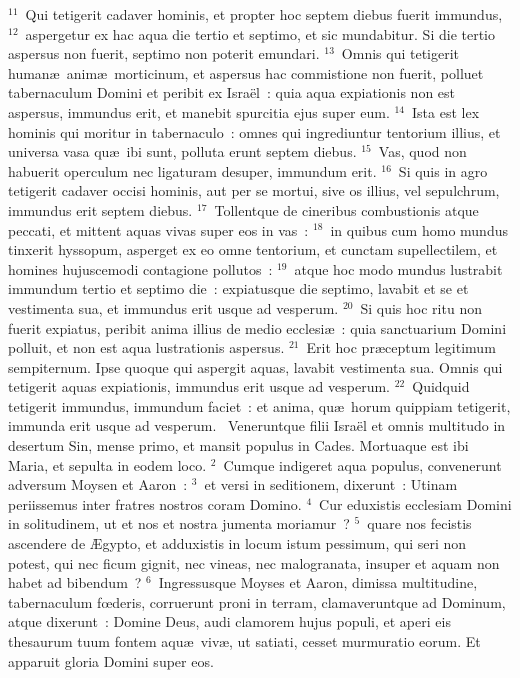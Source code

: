 ${}^{11}$~Qui tetigerit cadaver hominis, et propter hoc septem diebus fuerit immundus,
${}^{12}$~aspergetur ex hac aqua die tertio et septimo, et sic mundabitur. Si die tertio aspersus non fuerit, septimo non poterit emundari.
${}^{13}$~Omnis qui tetigerit human\ae\ anim\ae\ morticinum, et aspersus hac commistione non fuerit, polluet tabernaculum Domini et peribit ex Isra\"el~: quia aqua expiationis non est aspersus, immundus erit, et manebit spurcitia ejus super eum.
${}^{14}$~Ista est lex hominis qui moritur in tabernaculo~: omnes qui ingrediuntur tentorium illius, et universa vasa qu\ae\ ibi sunt, polluta erunt septem diebus.
${}^{15}$~Vas, quod non habuerit operculum nec ligaturam desuper, immundum erit.
${}^{16}$~Si quis in agro tetigerit cadaver occisi hominis, aut per se mortui, sive os illius, vel sepulchrum, immundus erit septem diebus.
${}^{17}$~Tollentque de cineribus combustionis atque peccati, et mittent aquas vivas super eos in vas~:
${}^{18}$~in quibus cum homo mundus tinxerit hyssopum, asperget ex eo omne tentorium, et cunctam supellectilem, et homines hujuscemodi contagione pollutos~:
${}^{19}$~atque hoc modo mundus lustrabit immundum tertio et septimo die~: expiatusque die septimo, lavabit et se et vestimenta sua, et immundus erit usque ad vesperum.
${}^{20}$~Si quis hoc ritu non fuerit expiatus, peribit anima illius de medio ecclesi\ae~: quia sanctuarium Domini polluit, et non est aqua lustrationis aspersus.
${}^{21}$~Erit hoc pr\ae ceptum legitimum sempiternum. Ipse quoque qui aspergit aquas, lavabit vestimenta sua. Omnis qui tetigerit aquas expiationis, immundus erit usque ad vesperum.
${}^{22}$~Quidquid tetigerit immundus, immundum faciet~: et anima, qu\ae\ horum quippiam tetigerit, immunda erit usque ad vesperum.
~Veneruntque filii Isra\"el et omnis multitudo in desertum Sin, mense primo, et mansit populus in Cades. Mortuaque est ibi Maria, et sepulta in eodem loco.
${}^{2}$~Cumque indigeret aqua populus, convenerunt adversum Moysen et Aaron~:
${}^{3}$~et versi in seditionem, dixerunt~: Utinam periissemus inter fratres nostros coram Domino.
${}^{4}$~Cur eduxistis ecclesiam Domini in solitudinem, ut et nos et nostra jumenta moriamur~?
${}^{5}$~quare nos fecistis ascendere de \AE gypto, et adduxistis in locum istum pessimum, qui seri non potest, qui nec ficum gignit, nec vineas, nec malogranata, insuper et aquam non habet ad bibendum~?
${}^{6}$~Ingressusque Moyses et Aaron, dimissa multitudine, tabernaculum fœderis, corruerunt proni in terram, clamaveruntque ad Dominum, atque dixerunt~: Domine Deus, audi clamorem hujus populi, et aperi eis thesaurum tuum fontem aqu\ae\ viv\ae , ut satiati, cesset murmuratio eorum. Et apparuit gloria Domini super eos.


